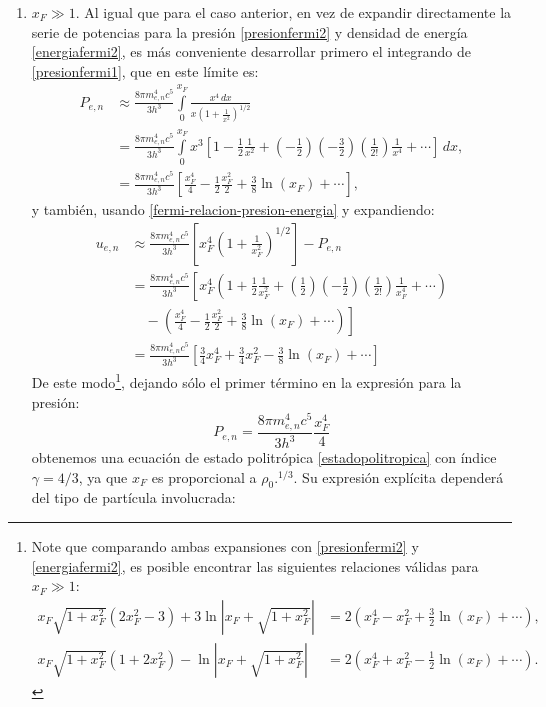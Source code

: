 \begin{enumerate}
\begin{enumerate}
\end{enumerate}
 \item $x_F\gg1$. Al igual que para el caso anterior, en vez de expandir directamente la serie de potencias para la presión \eqref{presionfermi2} y densidad de energía \eqref{energiafermi2}, es más conveniente desarrollar primero el integrando de \eqref{presionfermi1}, que en este límite es:
\begin{align}
P_{e,n}&\approx\frac{8\pi m_{e,n}^4c^5}{3h^3}\int\limits_0^{x_F}\frac{x^4\,dx}{x\left(1+\frac{1}{x^2}\right)^{1/2}}\\
&=\frac{8\pi m_{e,n}^4c^5}{3h^3}\int\limits_0^{x_F}x^3
\left[1-\frac{1}{2}\frac{1}{x^2}+\left(-\frac{1}{2}\right)\left(-\frac{3}{2}\right)\left(\frac{1}{2!}\right)\frac{1}{x^4}+\cdots\right]\,dx,\\
&=\frac{8\pi m_{e,n}^4c^5}{3h^3}\left[\frac{x_F^4}{4}-\frac{1}{2}\frac{x_F^2}{2}+\frac{3}{8}\ln(x_F)+\cdots\right],
\end{align}
y también, usando \eqref{fermi-relacion-presion-energia} y expandiendo:
\begin{align}
 u_{e,n}&\approx\frac{8\pi m_{e,n}^4c^5}{3h^3}\left[x_F^4\left(1+\frac{1}{x_F^2}\right)^{1/2}\right]-P_{e,n}\\
&=\frac{8\pi m_{e,n}^4c^5}{3h^3}\left[x_F^4\left(1+\frac{1}{2}\frac{1}{x_F^2}+\left(\frac{1}{2}\right)\left(-\frac{1}{2}\right)\left(\frac{1}{2!}\right)\frac{1}{x_F^4}+\cdots\right)\right.\\
&\left.\quad-\left(\frac{x_F^4}{4}-\frac{1}{2}\frac{x_F^2}{2}+\frac{3}{8}\ln(x_F)+\cdots\right)\right]\\
&=\frac{8\pi m_{e,n}^4c^5}{3h^3}\left[\frac{3}{4}x_F^4+\frac{3}{4}x_F^2-\frac{3}{8}\ln(x_F)+\cdots\right]\label{energia_expansion_fermi_relativista}
\end{align}
De este modo\footnote{Note que comparando ambas expansiones con \eqref{presionfermi2} y \eqref{energiafermi2}, es posible encontrar las siguientes relaciones válidas para $x_F\gg1$:
\begin{align}
 x_F\sqrt{1+x_F^2}\left(2x_F^2-3\right)+3\ln\left|x_F+\sqrt{1+x_F^2}\right|&=2\left(x_F^4-x_F^2+\frac{3}{2}\ln(x_F)+\cdots\right),\\
 x_F\sqrt{1+x_F^2}\left(1+2x_F^2\right)-\ln\left|x_F+\sqrt{1+x_F^2}\right|&=2\left(x_F^4+x_F^2-\frac{1}{2}\ln(x_F)+\cdots \right).
\end{align}
}, dejando sólo el primer término en la expresión para la presión:
\begin{equation}\label{presionfermi2-asintotico}
P_{e,n}=\frac{8\pi m_{e,n}^4c^5}{3h^3}\frac{x_F^4}{4}
\end{equation}
obtenemos una ecuación de estado politrópica \eqref{estadopolitropica} con índice $\gamma=4/3$, ya que $x_F$ es proporcional a $\rho_0.^{1/3}$. Su expresión explícita dependerá del tipo de partícula involucrada:


\end{enumerate}
